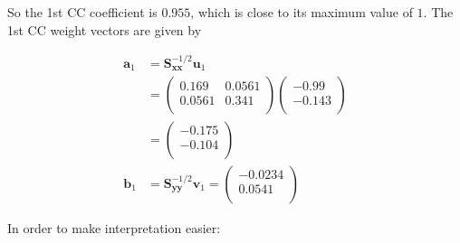 \documentclass[]{book}
\newenvironment{Shaded}{\begin{snugshade}}{\end{snugshade}}
\newcommand{\DecValTok}[1]{\textcolor[rgb]{0.00,0.00,0.81}{#1}}
\newcommand{\KeywordTok}[1]{\textcolor[rgb]{0.13,0.29,0.53}{\textbf{#1}}}
\newcommand{\NormalTok}[1]{#1}
\newcommand{\OperatorTok}[1]{\textcolor[rgb]{0.81,0.36,0.00}{\textbf{#1}}}
\newcommand{\StringTok}[1]{\textcolor[rgb]{0.31,0.60,0.02}{#1}}
\theoremstyle{definition}
\theoremstyle{definition}
\theoremstyle{definition}
\theoremstyle{remark}
\begin{document}
\begin{Shaded}
\end{Shaded}

So the 1st CC coefficient is \(0.955\), which is close to its maximum value of \(1\). The 1st CC weight vectors are
given by

\begin{Shaded}
\end{Shaded}

\begin{align*}
\boldsymbol a_1&=\boldsymbol S_{\boldsymbol x\boldsymbol x}^{-1/2}\boldsymbol u_1\\
&=\begin{pmatrix}0.169&0.0561 \\0.0561&0.341 \\\end{pmatrix}\begin{pmatrix}-0.99 \\-0.143 \\\end{pmatrix}\\
&=\begin{pmatrix}-0.175 \\-0.104 \\\end{pmatrix}\\
\boldsymbol b_1 &=\boldsymbol S_{\boldsymbol y\boldsymbol y}^{-1/2}\boldsymbol v_1= \begin{pmatrix}-0.0234 \\0.0541 \\\end{pmatrix}
\end{align*}

In order to make interpretation easier:
\end{document}
